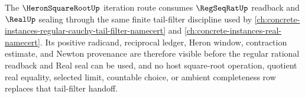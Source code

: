 The $\HeronSquareRootUp$ iteration route consumes $\RegSeqRatUp$ readback and $\RealUp$ sealing through the same finite tail-filter discipline used by \autoref{ch:concrete-instances-regular-cauchy-tail-filter-namecert} and \autoref{ch:concrete-instances-real-namecert}. Its positive radicand, reciprocal ledger, Heron window, contraction estimate, and Newton provenance are therefore visible before the regular rational readback and Real seal can be used, and no host square-root operation, quotient real equality, selected limit, countable choice, or ambient completeness row replaces that tail-filter handoff.
